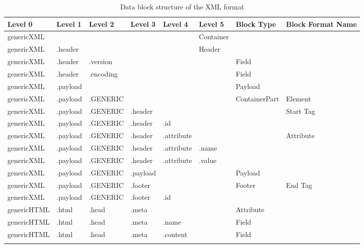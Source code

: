 \begin{longtable}{|p{}|p{}|p{}|p{}|p{}|p{}|p{}|p{}|}
	\hline
	Level 0 & Level 1 & Level 2 & Level 3 & Level 4 & Level 5 & Block Type & Block Format Name\\
	\endhead
	\hline
 	genericXML & & & & & Container & & \\
	\hline
 	genericXML & .header & & & & Header & & \\
	\hline
 	genericXML & .header & .version & & & & Field & \\
	\hline
 	genericXML & .header & .encoding & & & & Field & \\
	\hline
 	genericXML & .payload & & & & & Payload & \\
	\hline
 	genericXML & .payload & .GENERIC & & & & ContainerPart & Element\\
	\hline
 	genericXML & .payload & .GENERIC & .header & & & & Start Tag\\
	\hline
 	genericXML & .payload & .GENERIC & .header & .id & & & \\
	\hline
 	genericXML & .payload & .GENERIC & .header & .attribute & & & Attribute\\
	\hline
 	genericXML & .payload & .GENERIC & .header & .attribute & .name & & \\
	\hline
 	genericXML & .payload & .GENERIC & .header & .attribute & .value & & \\
	\hline
 	genericXML & .payload & .GENERIC & .payload & & & Payload & \\
	\hline
 	genericXML & .payload & .GENERIC & .footer & & & Footer & End Tag\\
	\hline
 	genericXML & .payload & .GENERIC & .footer & .id & & & \\
	\hline
 	genericHTML & .html & .head & .meta & & & Attribute & \\
	\hline
 	genericHTML & .html & .head & .meta & .name & & Field & \\
	\hline
 	genericHTML & .html & .head & .meta & .content & & Field & \\
	\hline
	\caption{Data block structure of the XML format}
	\label{tab:DatablockstructureoftheXMLformats}
\end{longtable}



